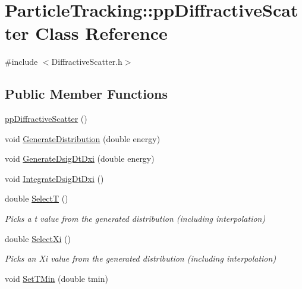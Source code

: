 \hypertarget{classParticleTracking_1_1ppDiffractiveScatter}{}\section{Particle\+Tracking\+:\+:pp\+Diffractive\+Scatter Class Reference}
\label{classParticleTracking_1_1ppDiffractiveScatter}


{\ttfamily \#include $<$Diffractive\+Scatter.\+h$>$}

\subsection*{Public Member Functions}
\begin{DoxyCompactItemize}
\item 
\hyperlink{classParticleTracking_1_1ppDiffractiveScatter_a1127d26a2b1b95632ed823ef803a855b}{pp\+Diffractive\+Scatter} ()
\item 
void \hyperlink{classParticleTracking_1_1ppDiffractiveScatter_adaec9271ebbbc79bf484f5bbd7e89605}{Generate\+Distribution} (double energy)
\item 
void \hyperlink{classParticleTracking_1_1ppDiffractiveScatter_aea40467446793fb960701530018efdc5}{Generate\+Dsig\+Dt\+Dxi} (double energy)
\item 
void \hyperlink{classParticleTracking_1_1ppDiffractiveScatter_afa8a735da9c32b48a09f014a00ea8265}{Integrate\+Dsig\+Dt\+Dxi} ()
\item 
double \hyperlink{classParticleTracking_1_1ppDiffractiveScatter_ab76465efcf0e83555243d73f93a7049b}{SelectT} ()
\begin{DoxyCompactList}\small\item\em Picks a t value from the generated distribution (including interpolation) \end{DoxyCompactList}\item 
double \hyperlink{classParticleTracking_1_1ppDiffractiveScatter_a09ef68dfe8abc179ccabb766b0c46be1}{Select\+Xi} ()
\begin{DoxyCompactList}\small\item\em Picks an Xi value from the generated distribution (including interpolation) \end{DoxyCompactList}\item 
void \hyperlink{classParticleTracking_1_1ppDiffractiveScatter_a7daeefd79f8f288f6edc0b85c2acc1c7}{Set\+T\+Min} (double tmin)
\item 

\end{DoxyCompactItemize}
